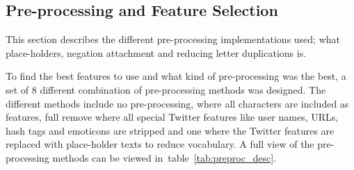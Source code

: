 \subsection{Pre-processing and Feature Selection}

This section describes the different pre-processing implementations used; what place-holders, negation attachment and reducing letter duplications is.

To find the best features to use and what kind of pre-processing was the best, a set of 8 different combination of pre-processing methods was designed. The different methods include no pre-processing, where all characters are included as features, full remove where all special Twitter features like user names, URLs, hash tags and emoticons are stripped and one where the Twitter features are replaced with place-holder texts to reduce vocabulary. A full view of the pre-processing methods can be viewed in~table~\ref{tab:preproc_desc}.

